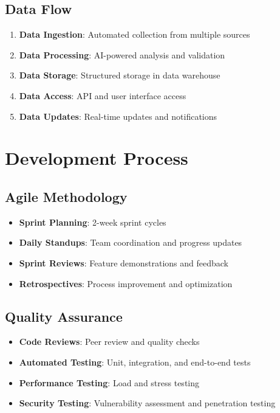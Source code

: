 \documentclass[business]{../templates/infraradar-main}
\begin{document}
\subsection{Data Flow}
\begin{enumerate}
    \item \textbf{Data Ingestion}: Automated collection from multiple sources
    \item \textbf{Data Processing}: AI-powered analysis and validation
    \item \textbf{Data Storage}: Structured storage in data warehouse
    \item \textbf{Data Access}: API and user interface access
    \item \textbf{Data Updates}: Real-time updates and notifications
\end{enumerate}

\section{Development Process}

\subsection{Agile Methodology}
\begin{itemize}
    \item \textbf{Sprint Planning}: 2-week sprint cycles
    \item \textbf{Daily Standups}: Team coordination and progress updates
    \item \textbf{Sprint Reviews}: Feature demonstrations and feedback
    \item \textbf{Retrospectives}: Process improvement and optimization
\end{itemize}

\subsection{Quality Assurance}
\begin{itemize}
    \item \textbf{Code Reviews}: Peer review and quality checks
    \item \textbf{Automated Testing}: Unit, integration, and end-to-end tests
    \item \textbf{Performance Testing}: Load and stress testing
    \item \textbf{Security Testing}: Vulnerability assessment and penetration testing
\end{itemize}
\end{document}
